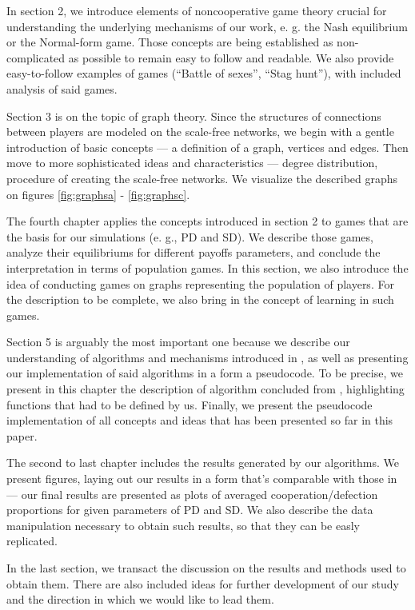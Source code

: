 \documentclass[english, twoside, 12pt, a4paper]{article}
\theoremstyle{definition}
\theoremstyle{plain}
\theoremstyle{remark}
\begin{document}
In section 2, we introduce elements of noncooperative game theory crucial for understanding the underlying mechanisms of our work, e. g. the Nash equilibrium or the Normal-form game. Those concepts are being established as non-complicated as possible to remain easy to follow and readable. We also provide easy-to-follow examples of games (\enquote{Battle of sexes}, \enquote{Stag hunt}), with included analysis of said games.

Section 3 is on the topic of graph theory. Since the structures of connections between players are modeled on the scale-free networks, we begin with a gentle introduction of basic concepts --- a definition of a graph, vertices and edges. Then move to more sophisticated ideas and characteristics --- degree distribution, procedure of creating the scale-free networks. We visualize the described graphs on figures \ref{fig:graphsa} - \ref{fig:graphsc}.

The fourth chapter applies the concepts introduced in section 2 to games that are the basis for our simulations (e. g., PD and SD). We describe those games, analyze their equilibriums for different payoffs parameters, and conclude the interpretation in terms of population games. In this section, we also introduce the idea of conducting games on graphs representing the population of players. For the description to be complete, we also bring in the concept of learning in such games.

Section 5 is arguably the most important one because we describe our understanding of algorithms and mechanisms introduced in \cite{santos2005scale}, as well as presenting our implementation of said algorithms in a form a pseudocode. To be precise, we present in this chapter the description of algorithm concluded from \cite{santos2005scale}, highlighting functions that had to be defined by us. Finally, we present the pseudocode implementation of all concepts and ideas that has been presented so far in this paper.

The second to last chapter includes the results generated by our algorithms. We present figures, laying out our results in a form that's comparable with those in \cite{santos2005scale} --- our final results are presented as plots of averaged cooperation/defection proportions for given parameters of PD and SD. We also describe the data manipulation necessary to obtain such results, so that they can be easly replicated. 

In the last section, we transact the discussion on the results and methods used to obtain them. There are also included ideas for further development of our study and the direction in which we would like to lead them. 
\end{document}
